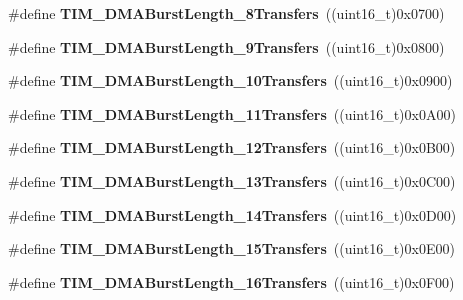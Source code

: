 \begin{DoxyCompactItemize}
\item 
\hypertarget{group__TIM__DMA__Burst__Length_ga8a760d7114425596736b0ecdbe5fdea6}{
\#define {\bfseries TIM\_\-DMABurstLength\_\-8Transfers}~((uint16\_\-t)0x0700)}
\label{group__TIM__DMA__Burst__Length_ga8a760d7114425596736b0ecdbe5fdea6}

\item 
\hypertarget{group__TIM__DMA__Burst__Length_ga98b208205c133557a9d67a0921559a66}{
\#define {\bfseries TIM\_\-DMABurstLength\_\-9Transfers}~((uint16\_\-t)0x0800)}
\label{group__TIM__DMA__Burst__Length_ga98b208205c133557a9d67a0921559a66}

\item 
\hypertarget{group__TIM__DMA__Burst__Length_ga2fc09f2148cf6ebddc8e67116212259c}{
\#define {\bfseries TIM\_\-DMABurstLength\_\-10Transfers}~((uint16\_\-t)0x0900)}
\label{group__TIM__DMA__Burst__Length_ga2fc09f2148cf6ebddc8e67116212259c}

\item 
\hypertarget{group__TIM__DMA__Burst__Length_ga0ca63a3caeaf1e85bd54961891949de7}{
\#define {\bfseries TIM\_\-DMABurstLength\_\-11Transfers}~((uint16\_\-t)0x0A00)}
\label{group__TIM__DMA__Burst__Length_ga0ca63a3caeaf1e85bd54961891949de7}

\item 
\hypertarget{group__TIM__DMA__Burst__Length_ga9160d52913bbd7ad1e663ff943d01852}{
\#define {\bfseries TIM\_\-DMABurstLength\_\-12Transfers}~((uint16\_\-t)0x0B00)}
\label{group__TIM__DMA__Burst__Length_ga9160d52913bbd7ad1e663ff943d01852}

\item 
\hypertarget{group__TIM__DMA__Burst__Length_ga11485e9eee8a6a7edc1df868755eab85}{
\#define {\bfseries TIM\_\-DMABurstLength\_\-13Transfers}~((uint16\_\-t)0x0C00)}
\label{group__TIM__DMA__Burst__Length_ga11485e9eee8a6a7edc1df868755eab85}

\item 
\hypertarget{group__TIM__DMA__Burst__Length_gab1a097ca7404e518839df99795443fb0}{
\#define {\bfseries TIM\_\-DMABurstLength\_\-14Transfers}~((uint16\_\-t)0x0D00)}
\label{group__TIM__DMA__Burst__Length_gab1a097ca7404e518839df99795443fb0}

\item 
\hypertarget{group__TIM__DMA__Burst__Length_gad13373f5fd246557a4fc487dc43c37ec}{
\#define {\bfseries TIM\_\-DMABurstLength\_\-15Transfers}~((uint16\_\-t)0x0E00)}
\label{group__TIM__DMA__Burst__Length_gad13373f5fd246557a4fc487dc43c37ec}

\item 
\hypertarget{group__TIM__DMA__Burst__Length_gafb644e6033f7b46c602b02754b69fde0}{
\#define {\bfseries TIM\_\-DMABurstLength\_\-16Transfers}~((uint16\_\-t)0x0F00)}
\label{group__TIM__DMA__Burst__Length_gafb644e6033f7b46c602b02754b69fde0}


\end{DoxyCompactItemize}
